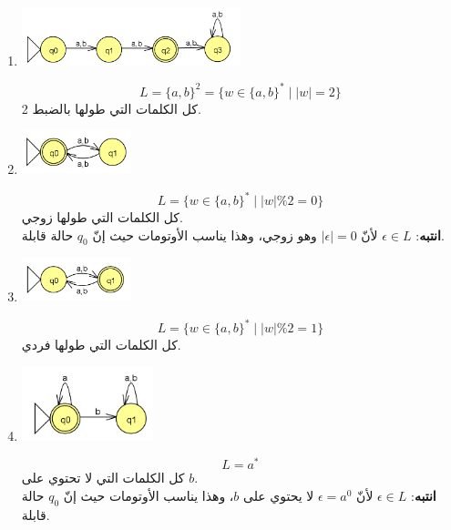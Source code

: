 ﻿\documentclass[12pt]{article}
\begin{document}
\begin{enumerate}[itemsep=3em]
\begin{enumerate}
\item
\includegraphics[width=0.5\textwidth]{../../../images/DFAs/ex1_q4.png}\\
\ifwithsols
\begin{boxSolution}
\[ L = \{a, b\}^2 = \{ w \in \{a,b\}^* \mid |w|=2 \} \]
كل الكلمات التي طولها بالضبط 2.
\end{boxSolution}
\fi

\item
\includegraphics[width=0.25\textwidth]{../../../images/DFAs/ex1_q5.png}\\
\ifwithsols
\begin{boxSolution}
\[ L = \{ w \in \{a,b\}^* \mid |w| \% 2 = 0 \} \]
كل الكلمات التي طولها زوجي. \\
\textbf{انتبه}: $\epsilon \in L$ لأنّ $|\epsilon|=0$ وهو زوجي، وهذا يناسب الأوتومات حيث إنّ $q_0$ حالة قابلة.
\end{boxSolution}
\fi

\item
\includegraphics[width=0.25\textwidth]{../../../images/DFAs/ex1_q6.png}\\
\ifwithsols
\begin{boxSolution}
\[ L = \{ w \in \{a,b\}^* \mid |w| \% 2 = 1 \} \]
كل الكلمات التي طولها فردي.
\end{boxSolution}
\fi

\item
\includegraphics[width=0.3\textwidth]{../../../images/DFAs/ex1_q7.png}\\
\ifwithsols
\begin{boxSolution}
\[ L = a^* \]
كل الكلمات التي لا تحتوي على $b$. \\
\textbf{انتبه}: $\epsilon \in L$ لأنّ $\epsilon = a^0$ لا يحتوي على $b$، وهذا يناسب الأوتومات حيث إنّ $q_0$ حالة قابلة.
\end{boxSolution}
\fi


\end{enumerate}
\end{enumerate}
\end{document}

